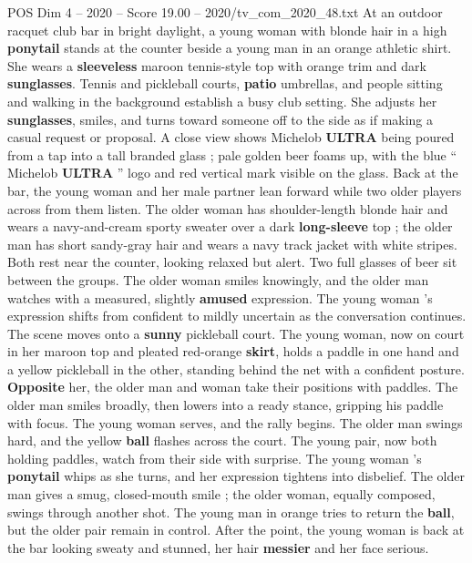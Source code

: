 \begin{textsample}{POS Dim 4 – 2020 – Score 19.00 – 2020/tv\_com\_2020\_48.txt}  \label{ex:f4_pos_005}
At an outdoor racquet club bar in bright daylight, a young woman with blonde hair in a high \textbf{ponytail} stands at the counter beside a young man in an orange athletic shirt.
She wears a \textbf{sleeveless} maroon tennis-style top with orange trim and dark \textbf{sunglasses}.
Tennis and pickleball courts, \textbf{patio} umbrellas, and people sitting and walking in the background establish a busy club setting.
She adjusts her \textbf{sunglasses}, smiles, and turns toward someone off to the side as if making a casual request or proposal.
A close view shows Michelob \textbf{ULTRA} being poured from a tap into a tall branded glass ; pale golden beer foams up, with the blue “ Michelob \textbf{ULTRA} ” logo and red vertical mark visible on the glass.
Back at the bar, the young woman and her male partner lean forward while two older players across from them listen.
The older woman has shoulder-length blonde hair and wears a navy-and-cream sporty sweater over a dark \textbf{long-sleeve} top ; the older man has short sandy-gray hair and wears a navy track jacket with white stripes.
Both rest near the counter, looking relaxed but alert.
Two full glasses of beer sit between the groups.
The older woman smiles knowingly, and the older man watches with a measured, slightly \textbf{amused} expression.
The young woman ’s expression shifts from confident to mildly uncertain as the conversation continues.
The scene moves onto a \textbf{sunny} pickleball court.
The young woman, now on court in her maroon top and pleated red-orange \textbf{skirt}, holds a paddle in one hand and a yellow pickleball in the other, standing behind the net with a confident posture. \textbf{Opposite} her, the older man and woman take their positions with paddles.
The older man smiles broadly, then lowers into a ready stance, gripping his paddle with focus.
The young woman serves, and the rally begins.
The older man swings hard, and the yellow \textbf{ball} flashes across the court.
The young pair, now both holding paddles, watch from their side with surprise.
The young woman ’s \textbf{ponytail} whips as she turns, and her expression tightens into disbelief.
The older man gives a smug, closed-mouth smile ; the older woman, equally composed, swings through another shot.
The young man in orange tries to return the \textbf{ball}, but the older pair remain in control.
After the point, the young woman is back at the bar looking sweaty and stunned, her hair \textbf{messier} and her face serious.

\end{textsample}
